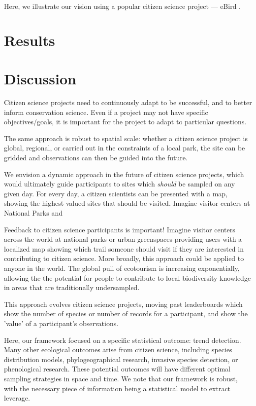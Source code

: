 \documentclass[9pt,twocolumn,twoside,lineno]{pnas-new}
\begin{document}
Here, we illustrate our vision using a popular citizen science project --- eBird \cite{sullivan2009ebird}.

\section*{Results}


\section*{Discussion}
Citizen science projects need to continuously adapt to be successful, and to better inform conservation science. Even if a project may not have specific objectives/goals, it is important for the project to adapt to particular questions.

The same approach is robust to spatial scale: whether a citizen science project is global, regional, or carried out in the constraints of a local park, the site can be gridded and observations can then be guided into the future.


We envision a dynamic approach in the future of citizen science projects, which would ultimately guide participants to sites which \textit{should} be sampled on any given day. For every day, a citizen scientists can be presented with a map, showing the highest valued sites that should be visited. Imagine visitor centers at National Parks and

Feedback to citizen science participants is important! Imagine visitor centers across the world at national parks or urban greenspaces providing users with a localized map showing which trail someone should visit if they are interested in contributing to citizen science. More broadly, this approach could be applied to anyone in the world. The global pull of ecotourism is increasing exponentially, allowing the the potential for people to contribute to local biodiversity knowledge in areas that are traditionally undersampled.

This approach evolves citizen science projects, moving past leaderboards which show the number of species or number of records for a participant, and show the 'value' of a participant's observations.

Here, our framework focused on a specific statistical outcome: trend detection. Many other ecological outcomes arise from citizen science, including species distribution models, phylogeographical research, invasive species detection, or phenological research. These potential outcomes will have different optimal sampling strategies in space and time. We note that our framework is robust, with the necessary piece of information being a statistical model to extract leverage.
\end{document}
